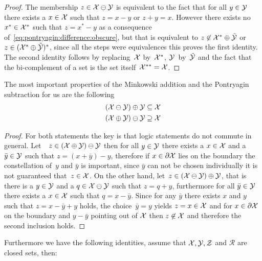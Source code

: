 %
\begin{proof}
The membership $z\in\mathcal X\ominus\mathcal Y$ is equivalent to the fact that for all $y\in\mathcal Y$ there exists a $x\in\mathcal X$ such that $z=x-y$ or $z+y=x$.
%
However there exists no $x^\ast\in\mathcal X^\ast$ such that $z=x^\ast-y$ as a consequence of~\eqref{eq:pontryagin:difference:obscure}, but that is equivalent to $z\not\in\mathcal X^\ast\oplus\tilde{\mathcal Y}$ or $z\in(\mathcal X^\ast\oplus\tilde{\mathcal Y})^\ast$, since all the steps were equivalences this proves the first identity. 
%
The second identity follows by replacing~$\mathcal X$ by~$\mathcal X^\ast$, $\mathcal Y$~by~$\tilde{\mathcal Y}$ and the fact that the bi-complement of a set is the set itself~$\mathcal X^{\ast\ast}=\mathcal X$.
\end{proof}
%
\mysplit The most important properties of the Minkowski addition and the Pontryagin subtraction for us are the following
%
\begin{equation}\label{eq:identity:for:pontryagin:minkowski:connection}
	\begin{aligned}
	\left(\mathcal X\ominus\mathcal Y\right)\oplus\mathcal Y&\subseteq\mathcal X\\
	\left(\mathcal X\oplus\mathcal Y\right)\ominus\mathcal Y&\supseteq\mathcal X
	\end{aligned}
\end{equation}
%
\begin{proof}
For both statements the key is that logic statements do not commute in general.
%
Let~~$z\in\left(\mathcal X\oplus\mathcal Y\right)\ominus\mathcal Y$ then for all $y\in\mathcal Y$ there exists a $x\in\mathcal X$ and a $\bar y\in\mathcal Y$ such that $z=(x+\bar y)-y$, therefore if $x\in\partial\mathcal X$ lies on the boundary the constellation of~$y$ and $\bar y$ is important, since $\bar y$ can not be chosen individually it is not guaranteed that~$z\in\mathcal X$.
%
On the other hand, let~$z\in\left(\mathcal X\ominus\mathcal Y\right)\oplus\mathcal Y$, that is there is a $y\in\mathcal Y$ and a $q\in\mathcal X\ominus\mathcal Y$ such that $z=q+y$, furthermore for all $\bar y\in\mathcal Y$ there exists a $x\in\mathcal X$ such that $q=x-\bar y$.
%
Since for any $\bar y$ there exists $x$ and $y$ such that $z=x-\bar y+y$ holds, the choice~$\bar y=y$ yields $z=x\in\mathcal X$ and for $x\in\partial\mathcal X$ on the boundary and $y-\bar y$ pointing out of $\mathcal X$ then $z\not\in\mathcal X$ and therefore the second inclusion holds.
\end{proof}
%
%
\mysplit Furthermore we have the following identities, assume that $\mathcal X,\mathcal Y,\mathcal Z$ and $\mathcal R$ are closed sets, then:
%
